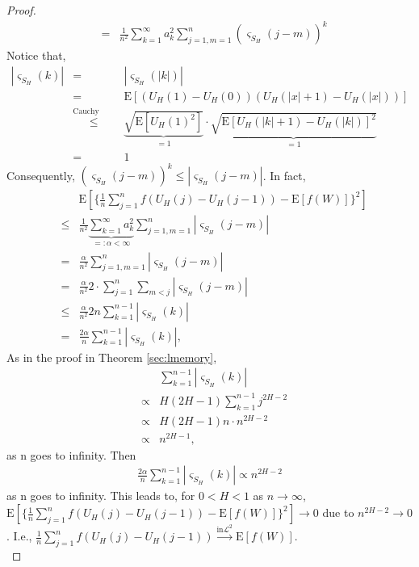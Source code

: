 \documentclass[a4paper, twoside, 11pt]{article}
\theoremstyle{definition}
\begin{document}
\begin{proof}
\begin{eqnarray*}
	&=& \frac{1}{n^2} \sum\limits_{k=1}^\infty a_k^2\sum\limits_{j=1, m=1}^n (\varsigma_{S_H}(j-m))^k
  \end{eqnarray*}
	Notice that,
	\begin{eqnarray*}
	  |\varsigma_{S_H}(k)| &=& |\varsigma_{S_H}(|k|)|\\
	  &=& \mathrm{E}[(U_H(1) - U_H(0))(U_H(|x|+1)-U_H(|x|))]\\
	  &\overset{\text{Cauchy Schwartz}}{\le}& \underbrace{\sqrt{\mathrm{E}[U_H(1)^2]}}_{= 1}\cdot \underbrace{\sqrt{\mathrm{E}[U_H(|k|+1) - U_H(|k|)]^2}}_{= 1}\\
	  &=& 1
	\end{eqnarray*}
	Consequently, $(\varsigma_{S_H}(j-m))^k \le |\varsigma_{S_H}(j-m)|$. In fact,
	\begin{eqnarray*}
	  && \mathrm{E}[\{\frac{1}{n}\sum\limits_{j=1}^n f(U_H(j) - U_H(j-1)) - \mathrm{E}[f(W)]\}^2]\\
	  &\le& \frac{1}{n^2} \underbrace{\sum\limits_{k=1}^\infty a_k^2}_{=:\alpha < \infty}\sum\limits_{j=1, m=1}^n |\varsigma_{S_H}(j-m)|\\
	  &=& \frac{\alpha}{n^2} \sum\limits_{j=1, m=1}^n |\varsigma_{S_H}(j-m)|\\
	  &=& \frac{\alpha}{n^2} 2 \cdot \sum\limits_{j=1}^n  \sum\limits_{m<j} |\varsigma_{S_H}(j-m)|\\
	  &\le& \frac{\alpha}{n^2} 2n \sum\limits_{k=1}^{n-1} |\varsigma_{S_H}(k)|\\
	  &=& \frac{2\alpha}{n}  \sum\limits_{k=1}^{n-1} |\varsigma_{S_H}(k)|,
	\end{eqnarray*}
	As in the proof in Theorem \ref{sec:lmemory}, 
	\begin{eqnarray*}
	&&\sum\limits_{k=1}^{n-1} |\varsigma_{S_H}(k)| \\
	&\propto& H(2H-1)\sum\limits_{k=1}^{n-1}j^{2H-2} \\
	&\propto& H(2H-1)n\cdot n^{2H-2} \\
	&\propto& n^{2H-1}, 
  \end{eqnarray*}
  as n goes to infinity. Then
	\begin{eqnarray*}
	  \frac{2\alpha}{n} \sum\limits_{k=1}^{n-1} |\varsigma_{S_H}(k)| \propto n^{2H-2}
	\end{eqnarray*}
	as n goes to infinity. This leads to,  for $0<H<1$ as $n \rightarrow \infty$,  $\mathrm{E}[\{\frac{1}{n}\sum\limits_{j=1}^n f(U_H(j) - U_H(j-1)) - \mathrm{E}[f(W)]\}^2]\rightarrow 0$ due to $n^{2H-2}\rightarrow 0$. I.e., $\frac{1}{n}\sum\limits_{j=1}^n f(U_H(j) - U_H(j-1)) \overset{\text{in} \mathcal{L}^2}{\rightarrow} \mathrm{E}[f(W)]$.\\


\end{proof}
\end{document}
